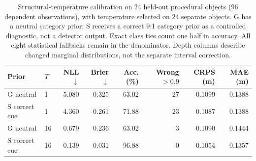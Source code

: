 \begin{table}[tbp]
\centering\small
\caption{Structural-temperature calibration on 24 held-out procedural objects (96 dependent observations), with temperature selected on 24 separate objects. G has a neutral category prior; S receives a correct 9:1 category prior as a controlled diagnostic, not a detector output. Exact class ties count one half in accuracy. All eight statistical fallbacks remain in the denominator. Depth columns describe changed marginal distributions, not the separate interval correction.}
\label{tab:b9-structure}
\begin{tabular}{llrrrrrr}
\toprule
Prior & $T$ & NLL $\downarrow$ & Brier $\downarrow$ & Acc. (\%) & Wrong $>0.9$ & CRPS (m) & MAE (m) \\
\midrule
G neutral & 1 & 5.080 & 0.325 & 63.02 & 27 & 0.1099 & 0.1388 \\
S correct cue & 1 & 4.360 & 0.261 & 71.88 & 23 & 0.1087 & 0.1388 \\
G neutral & 16 & 0.679 & 0.236 & 63.02 & 3 & 0.1090 & 0.1444 \\
S correct cue & 16 & 0.139 & 0.031 & 96.88 & 0 & 0.1054 & 0.1357 \\
\bottomrule
\end{tabular}
\end{table}
